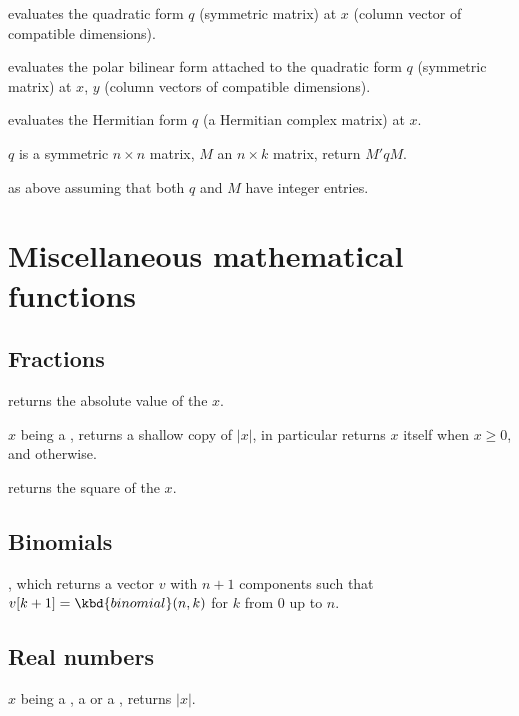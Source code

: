  evaluates the quadratic form
$q$ (symmetric matrix) at $x$ (column vector of compatible dimensions).

 evaluates the polar bilinear form
attached to the quadratic form $q$ (symmetric matrix) at $x$, $y$ (column
vectors of compatible dimensions).

 evaluates the Hermitian form $q$
(a Hermitian complex matrix) at $x$.

 $q$ is a symmetric $n\times n$ matrix,
$M$ an $n\times k$ matrix, return $M' q M$.

 as above assuming that both
$q$ and $M$ have integer entries.

\newpage
\chapter{Miscellaneous mathematical functions}

\section{Fractions}

 returns the absolute value of the  $x$.

 $x$ being a , returns a shallow
copy of $|x|$, in particular returns $x$ itself when $x \geq 0$, and
 otherwise.

 returns the square of the  $x$.

\section{Binomials}



, which returns a vector $v$ with $n+1$
 components such that $v[k+1] = \kbd{binomial}(n,k)$ for $k$ from
$0$ up to $n$.

\section{Real numbers}

 $x$ being a , a  or a
, returns $|x|$.

